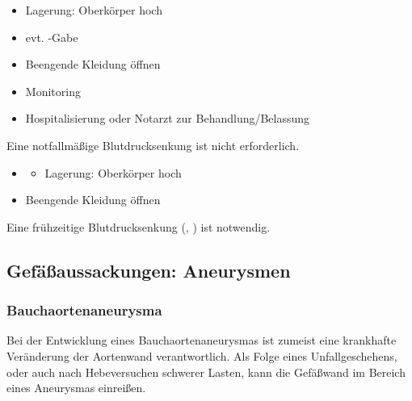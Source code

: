 {
\begin{itemize}
  \item Lagerung: Oberkörper hoch
  \item evt. -Gabe
  \item Beengende Kleidung öffnen
  \item Monitoring
  \item  Hospitalisierung oder Notarzt zur
  Behandlung/Belassung
\end{itemize}
Eine notfallmäßige Blutdrucksenkung ist nicht erforderlich.
}

{
\begin{itemize}
  \item \TxMassVitBes
  \begin{itemize}
    \item Lagerung: Oberkörper hoch
  \end{itemize}
  \item Beengende Kleidung öffnen
\end{itemize}

Eine frühzeitige Blutdrucksenkung (, )
ist notwendig. 

}




\subsection{Gefäßaussackungen: Aneurysmen}

\subsubsection{Bauchaortenaneurysma}
\nocite{Meron2004}

{%
Bei der Entwicklung eines Bauchaortenaneurysmas ist zumeist
eine krankhafte Veränderung der Aortenwand
verantwortlich. Als Folge eines Unfallgeschehens,
oder auch nach Hebeversuchen schwerer Lasten, kann die
Gefäßwand im Bereich eines Aneurysmas einreißen. 
}
{\SymbolText}{}{}{}

